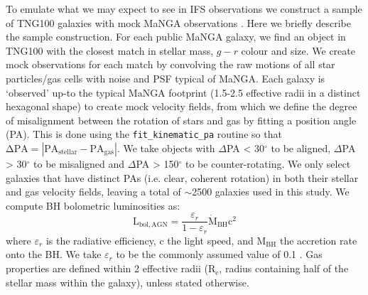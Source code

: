 \documentclass[fleqn,usenatbib]{mnras}
\begin{document}
To emulate what we may expect to see in IFS observations we construct a sample of TNG100 galaxies with mock MaNGA observations \citep[a complete description is given in][]{duckworth2019}. Here we briefly describe the sample construction. 
For each public MaNGA galaxy, we find an object in TNG100 with the closest match in stellar mass, $g-r$ colour and size. We create mock observations for each match by convolving the raw motions of all star particles/gas cells with noise and PSF typical of MaNGA. Each galaxy is `observed' up-to the typical MaNGA footprint (1.5-2.5 effective radii in a distinct hexagonal shape) to create mock velocity fields, from which we define the degree of misalignment between the rotation of stars and gas by fitting a position angle (PA). This is done using the \texttt{fit\_kinematic\_pa} routine \citep[see Appendix C of][]{krajnovic2006} so that $\mathrm{\Delta PA = |PA_{stellar} - PA_{gas}|}$. We take objects with $\Delta$PA < 30$^{\circ}$ to be aligned, $\Delta$PA > 30$^{\circ}$ to be misaligned and $\Delta$PA > 150$^{\circ}$ to be counter-rotating. We only select galaxies that have distinct PAs (i.e. clear, coherent rotation) in both their stellar and gas velocity fields, leaving a total of $\sim$2500 galaxies used in this study. We compute BH bolometric luminosities as:
\begin{equation}
\mathrm{L_{bol, AGN}} = \frac{\varepsilon_r}{1 - \varepsilon_r} \mathrm{\dot{M}_{BH} c^2}
\end{equation}
where $\varepsilon_r$ is the radiative efficiency, c the light speed, and $\mathrm{M_{BH}}$ the accretion rate onto the BH. We take $\varepsilon_r$ to be the commonly assumed value of 0.1 \citep[see discussion in][]{habouzit2019}. Gas properties are defined within 2 effective radii ($\mathrm{R_{e}}$, radius containing half of the stellar mass within the galaxy), unless stated otherwise.
\end{document}
